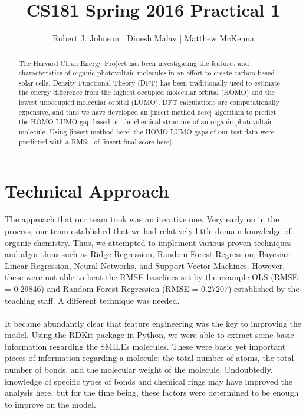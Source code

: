 \documentclass{article}
\begin{document}
\title{CS181 Spring 2016 Practical 1}
\author{Robert J. Johnson | Dinesh Malav | Matthew McKenna}


\maketitle

\begin{abstract}
The Harvard Clean Energy Project has been investigating the features and characteristics of organic photovoltaic molecules in an effort to create carbon-based solar cells. Density Functional Theory (DFT) has been traditionally used to estimate the energy difference from the highest occupied molecular orbital (HOMO) and the lowest unoccupied molecular orbital (LUMO). DFT calculations are computationally expensive, and thus we have developed an [insert method here] algorithm to predict the HOMO-LUMO gap based on the chemical structure of an organic photovoltaic molecule. Using [insert method here] the HOMO-LUMO gaps of our test data were predicted with a RMSE of [insert final score here].
\end{abstract}

\section{Technical Approach}
The approach that our team took was an iterative one. Very early on in the process, our team established that we had relatively little domain knowledge of organic chemistry. Thus, we attempted to implement various proven techniques and algorithms such as Ridge Regression, Random Forest Regression, Bayesian Linear Regression, Neural Networks, and Support Vector Machines. However, these were not able to beat the RMSE baselines set by the example OLS (RMSE = 0.29846) and Random Forest Regression (RMSE = 0.27207) established by the teaching staff. A different technique was needed.\\\\
It became abundantly clear that feature engineering was the key to improving the model. Using the RDKit package in Python, we were able to extract some basic information regarding the SMILEs molecules. These were basic yet important pieces of information regarding a molecule: the total number of atoms, the total number of bonds, and the molecular weight of the molecule. Undoubtedly, knowledge of specific types of bonds and chemical rings may have improved the analysis here, but for the time being, these factors were determined to be enough to improve on the model.\\\\
\end{document}
